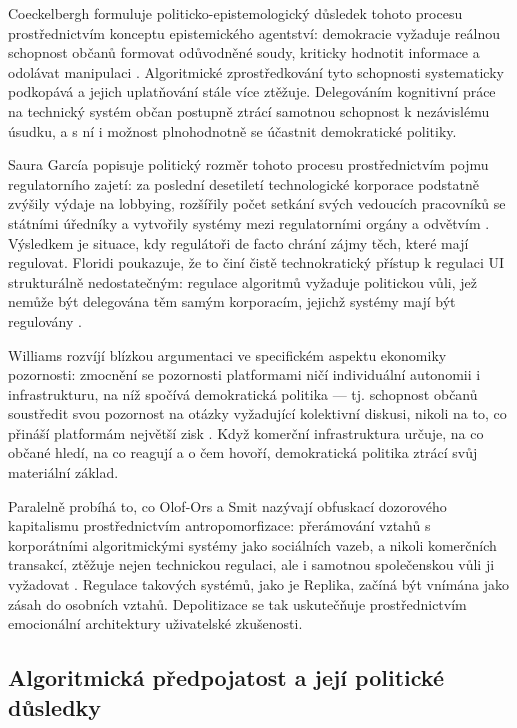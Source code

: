 Coeckelbergh formuluje politicko-epistemologický důsledek tohoto procesu prostřednictvím konceptu epistemického agentství: demokracie vyžaduje reálnou schopnost občanů formovat odůvodněné soudy, kriticky hodnotit informace a odolávat manipulaci \parencite{Coeckelbergh23}.
Algoritmické zprostředkování tyto schopnosti systematicky podkopává a jejich uplatňování stále více ztěžuje.
Delegováním kognitivní práce na technický systém občan postupně ztrácí samotnou schopnost k nezávislému úsudku, a s ní i možnost plnohodnotně se účastnit demokratické politiky.

Saura García popisuje politický rozměr tohoto procesu prostřednictvím pojmu regulatorního zajetí: za poslední desetiletí technologické korporace podstatně zvýšily výdaje na lobbying, rozšířily počet setkání svých vedoucích pracovníků se státními úředníky a vytvořily systémy  mezi regulatorními orgány a odvětvím \parencite{SauraGarcia24}.
Výsledkem je situace, kdy regulátoři de facto chrání zájmy těch, které mají regulovat.
Floridi poukazuje, že to činí čistě technokratický přístup k regulaci UI strukturálně nedostatečným: regulace algoritmů vyžaduje politickou vůli, jež nemůže být delegována těm samým korporacím, jejichž systémy mají být regulovány \parencite{Floridi23}.

Williams rozvíjí blízkou argumentaci ve specifickém aspektu ekonomiky pozornosti: zmocnění se pozornosti platformami ničí individuální autonomii i infrastrukturu, na níž spočívá demokratická politika — tj. schopnost občanů soustředit svou pozornost na otázky vyžadující kolektivní diskusi, nikoli na to, co přináší platformám největší zisk \parencite{Williams18}. Když komerční infrastruktura určuje, na co občané hledí, na co reagují a o čem hovoří, demokratická politika ztrácí svůj materiální základ.

Paralelně probíhá to, co Olof-Ors a Smit nazývají obfuskací dozorového kapitalismu prostřednictvím antropomorfizace: přerámování vztahů s korporátními algoritmickými systémy jako sociálních vazeb, a nikoli komerčních transakcí, ztěžuje nejen technickou regulaci, ale i samotnou společenskou vůli ji vyžadovat \parencite{OlofOrsSmit25}.
Regulace takových systémů, jako je Replika, začíná být vnímána jako zásah do osobních vztahů. Depolitizace se tak uskutečňuje prostřednictvím emocionální architektury uživatelské zkušenosti.

\subsection{Algoritmická předpojatost a její politické důsledky}

